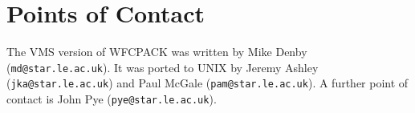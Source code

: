 \section{Points of Contact}
\label{sec:contact}

The VMS version of WFCPACK was written by Mike Denby ({\tt md@star.le.ac.uk}).
It was ported to UNIX by Jeremy Ashley ({\tt jka@star.le.ac.uk}) and Paul 
McGale ({\tt pam@star.le.ac.uk}).  A further point of contact is John Pye 
({\tt pye@star.le.ac.uk}).


